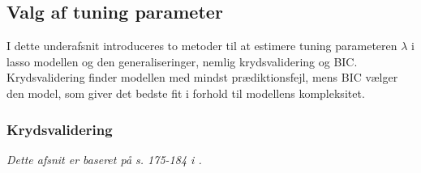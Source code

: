 \subsection{Valg af tuning parameter}
I dette underafsnit introduceres to metoder til at estimere tuning parameteren \(\lambda\) i lasso modellen og den generaliseringer, nemlig krydsvalidering og BIC. 
Krydsvalidering finder modellen med mindst prædiktionsfejl, mens BIC vælger den model, som giver det bedste fit i forhold til modellens kompleksitet. 

\subsubsection{Krydsvalidering}
\textit{Dette afsnit er baseret på s. 175-184 i \citep{james}.}



